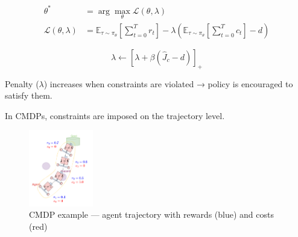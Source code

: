 \documentclass[8pt, aspectratio=169]{beamer} %
\begin{document}
\begin{frame}{\insertsubsectionhead}

  \begin{equation}
    \begin{aligned}
      \theta^* &= \arg\max_\theta \mathcal{L}(\theta, \lambda) \\
      \mathcal{L}(\theta, \lambda) &= \mathbb{E}_{\tau \sim \pi_\theta} \left[ \sum^T_{t = 0} r_t \right] - \lambda \left( \mathbb{E}_{\tau \sim \pi_\theta} \left[ \sum^T_{t = 0} c_t \right] - d \right)
    \end{aligned}
  \end{equation}

  \vspace{0.5cm}

  \begin{equation}
    \lambda \leftarrow \left[ \lambda + \beta\left( \hat{J}_c - d \right) \right]_+
  \end{equation}

  \vspace{0.5cm}

  Penalty ($\lambda$) increases when constraints are violated → policy is encouraged to satisfy them.


\end{frame}

\begin{frame}{\insertsubsectionhead}

  In CMDPs, constraints are imposed on the trajectory level.

  \begin{figure}
    \includegraphics[width=0.25\textwidth]{figures/constrained-rl2.pdf}
    \caption{CMDP example — agent trajectory with rewards (blue) and costs (red)}
  \end{figure}


\end{frame}
\end{document}
